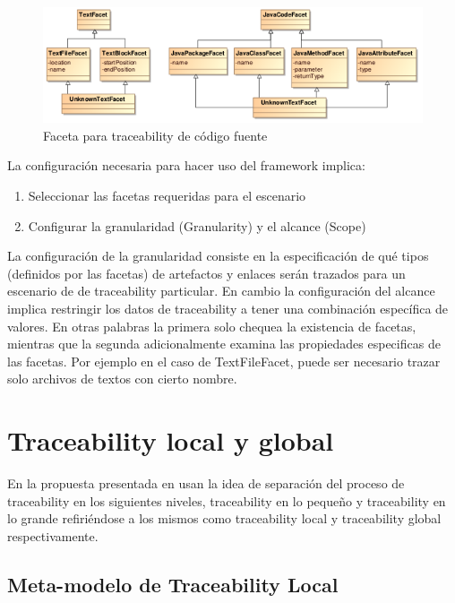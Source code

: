 \documentclass[a4paper,12pt,oneside]{book}
\begin{document}
\begin{figure}[hbtp]
\centering
\includegraphics[scale=.72]{./img/Faceta}
\caption{Faceta para traceability de código fuente}
\label{fig:FacetaCodigoFuente}
\end{figure}

La configuración necesaria para hacer uso del framework implica:

\begin{enumerate}
\item    Seleccionar las facetas requeridas para el escenario
\item    Configurar la granularidad (Granularity) y el alcance (Scope)
\end{enumerate}

La configuración de la granularidad consiste en la especificación de qué tipos (definidos por las facetas) de artefactos y enlaces serán trazados para un escenario de de traceability particular. En cambio la configuración del alcance implica restringir los datos de traceability a tener una combinación específica de valores. En otras palabras la primera solo chequea la existencia de facetas, mientras que la segunda adicionalmente examina las propiedades especificas de las facetas. Por ejemplo en el caso de TextFileFacet, puede ser necesario trazar solo archivos de textos con cierto nombre.

\section{Traceability local y global}

En la propuesta presentada en \cite{GlitiaEtienDumoulin} usan la idea de separación del proceso de traceability en los siguientes niveles, traceability en lo pequeño y traceability en lo grande refiriéndose a los mismos como traceability local y traceability global respectivamente.

\subsection{Meta-modelo de Traceability Local}
\end{document}

